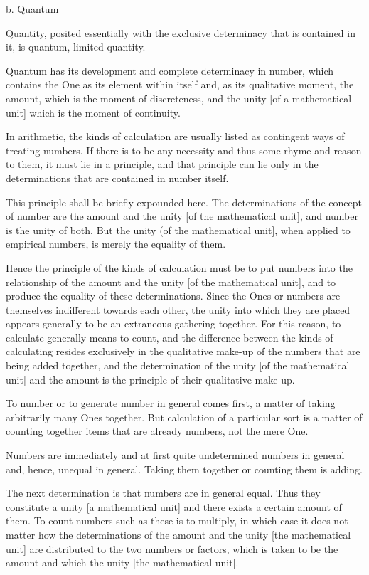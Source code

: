 b. Quantum

Quantity, posited essentially with the exclusive determinacy that
is contained in it, is quantum, limited quantity.

Quantum has its development and complete determinacy in number,
which contains the One as its element within itself and,
as its qualitative moment, the amount,
which is the moment of discreteness, and
the unity [of a mathematical unit]
which is the moment of continuity.

    In arithmetic, the kinds of calculation are
    usually listed as contingent ways of treating numbers.
    If there is to be any necessity and
    thus some rhyme and reason to them,
    it must lie in a principle, and
    that principle can lie only in
    the determinations that are contained in number itself.

    This principle shall be briefly expounded here.
    The determinations of the concept of number are
    the amount and the unity [of the mathematical unit],
    and number is the unity of both.
    But the unity (of the mathematical unit],
    when applied to empirical numbers,
    is merely the equality of them.

    Hence the principle of the kinds of calculation must be
    to put numbers into the relationship of
    the amount and the unity [of the mathematical unit],
    and to produce the equality of these determinations.
    Since the Ones or numbers are themselves indifferent towards
    each other, the unity into which they are placed appears generally
    to be an extraneous gathering together.
    For this reason, to calculate generally means to count, and
    the difference between the kinds of calculating
    resides exclusively in the qualitative make-up
    of the numbers that are being added together, and
    the determination of the unity [of the mathematical unit] and
    the amount is the principle of their qualitative make-up.

    To number or to generate number in general comes first,
    a matter of taking arbitrarily many Ones together.
    But calculation of a particular sort is a matter of
    counting together items that are already numbers,
    not the mere One.

    Numbers are immediately and at first quite undetermined
    numbers in general and, hence, unequal in general.
    Taking them together or counting them is adding.

    The next determination is that numbers are in general equal.
    Thus they constitute a unity [a mathematical unit] and
    there exists a certain amount of them.
    To count numbers such as these is to multiply,
    in which case it does not matter how the determinations
    of the amount and the unity [the mathematical unit] are distributed
    to the two numbers or factors,
    which is taken to be the amount
    and which the unity [the mathematical unit].

